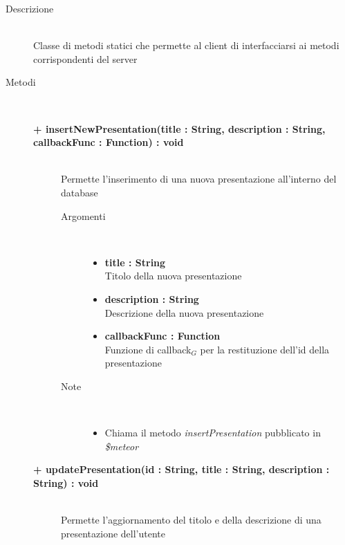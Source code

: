 \begin{description}
\item[Descrizione] \hfill \\
	Classe di metodi statici che permette al client di interfacciarsi ai metodi corrispondenti del server
	
	
\item[Metodi] \hfill \\

	\begin{description}
		\item[\textbf{\color{blue}+ insertNewPresentation(title : String, description : String, callbackFunc : Function) : void			}] \hfill \\
			Permette l'inserimento di una nuova presentazione all'interno del database
			
		\begin{description}
			\item[Argomenti] \hfill \\
				\begin{itemize}
				
					\item \textbf{title : String			} \hfill \\
					Titolo della nuova presentazione
					\item \textbf{description : String			} \hfill \\
					Descrizione della nuova presentazione
					\item \textbf{callbackFunc : Function			} \hfill \\
					Funzione di callback$_G$ per la restituzione dell'id della presentazione
					
				\end{itemize}
			\item[Note] \hfill \\
			\begin{itemize}
					\item Chiama il metodo \textit{insertPresentation} pubblicato in \textit{\$meteor}
			\end{itemize}
		\end{description}
	\end{description}



	\begin{description}
		\item[\textbf{\color{blue}+ updatePresentation(id : String, title : String, description : String) : void			}] \hfill \\
			Permette l'aggiornamento del titolo e della descrizione di una presentazione dell'utente
			

\end{description}
\end{description}
